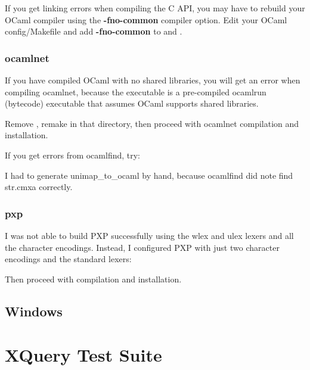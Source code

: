 {If you get linking errors when compiling the C API, you may have to
rebuild your OCaml compiler using the \textbf{-fno-common} compiler
option.  Edit your OCaml config/Makefile and add \textbf{-fno-common}
to 
 and .

\subsubsection{ocamlnet}                                                                                                                                          
If you have compiled OCaml with no shared libraries, you will get an
error when compiling ocamlnet, because 
the  executable 
is a pre-compiled ocamlrun (bytecode) executable that assumes 
OCaml supports shared libraries.

Remove , 
remake in that directory, then proceed with ocamlnet compilation and installation.

If you get errors from ocamlfind, try:


I had to generate unimap\_to\_ocaml by hand, because ocamlfind
did note find str.cmxa correctly. 

\subsubsection{pxp}

I was not able to build PXP successfully using the wlex and ulex
lexers and all the character encodings.  Instead, I configured PXP
with just two character encodings and the standard lexers:


Then proceed with compilation and installation.

\subsection{Windows}
\label{sec:os-notes-mingw}
}

\section{XQuery Test Suite}
\label{sec:testsuite}

